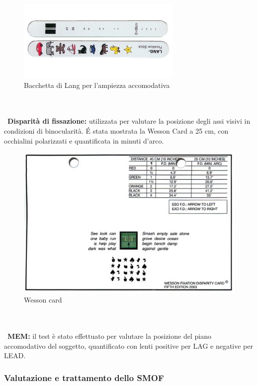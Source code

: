 \begin{figure}[h!]
	\centering
	\includegraphics[scale=0.5]{source/immagini/ampiezza_accomodativa.jpg}
	\caption[Semantic Web stack]{Bacchetta di Lang per l'ampiezza accomodativa}
	\label{fig:issuexample}
\end{figure}
\\\ \\\
\textbf{Disparità di fissazione:} utilizzata per valutare la posizione degli assi visivi in condizioni di binocularità. É stata mostrata
la Wesson Card a 25 cm, con occhialini polarizzati e quantificata in minuti d’arco.

\begin{figure}[h!]
	\centering
	\includegraphics[scale=0.22]{source/immagini/Wesson_card.jpg}
	\caption[Semantic Web stack]{Wesson card}
	\label{fig:issuexample}
\end{figure}
\\\ \\\
\textbf{MEM:} il test è stato effettuato per valutare la posizione del piano accomodativo del soggetto, quantificato con lenti
positive per LAG e negative per LEAD.

\subsubsection{Valutazione e trattamento dello SMOF}


